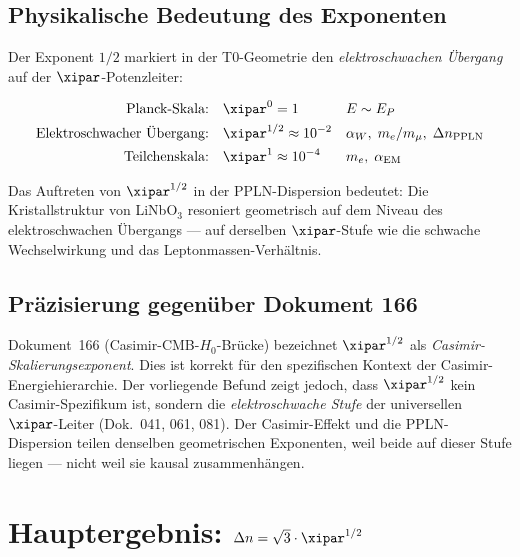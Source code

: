 \subsection{Physikalische Bedeutung des Exponenten}

Der Exponent $1/2$ markiert in der T0-Geometrie den \emph{elektroschwachen
Übergang} auf der $\xipar$-Potenzleiter:

\begin{align}
    \text{Planck-Skala:}\quad          & \xipar^0     = 1
        && E \sim E_P \notag \\
    \text{Elektroschwacher Übergang:}\quad & \xipar^{1/2} \approx 10^{-2}
        && \alpha_W,\; m_e/m_\mu,\; \Delta n_\text{PPLN}
        \label{eq:stufe} \\
    \text{Teilchenskala:}\quad         & \xipar^1     \approx 10^{-4}
        && m_e,\; \alpha_\mathrm{EM} \notag
\end{align}

Das Auftreten von $\xipar^{1/2}$ in der PPLN-Dispersion bedeutet:
Die Kristallstruktur von LiNbO$_3$ resoniert geometrisch auf dem Niveau
des elektroschwachen Übergangs — auf derselben $\xipar$-Stufe wie die
schwache Wechselwirkung und das Leptonmassen-Verhältnis.

\subsection{Präzisierung gegenüber Dokument 166}

Dokument~166 (Casimir-CMB-$H_0$-Brücke) bezeichnet $\xipar^{1/2}$ als
\emph{Casimir-Skalierungsexponent}. Dies ist korrekt für den spezifischen
Kontext der Casimir-Energiehierarchie. Der vorliegende Befund zeigt jedoch,
dass $\xipar^{1/2}$ kein Casimir-Spezifikum ist, sondern die
\emph{elektroschwache Stufe} der universellen $\xipar$-Leiter (Dok.~041,
061, 081). Der Casimir-Effekt und die PPLN-Dispersion teilen denselben
geometrischen Exponenten, weil beide auf dieser Stufe liegen — nicht weil
sie kausal zusammenhängen.

\clearpage

\section{Hauptergebnis: \texorpdfstring{$\Delta n = \sqrt{3}\cdot\xipar^{1/2}$}{%
  Delta n = sqrt(3) xi\^{}(1/2)}}
\label{sec:hauptergebnis}

